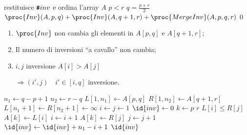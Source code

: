 \begin{codebox}
\zi \Comment restituisce $\verb|#| inv$ e ordina l'array $A$
\li \If $p < r$ 
\li \Then
		$q = \frac{p+r}{2}$
\li		\Return $\proc{Inv}(A,p,q) + \proc{Inv}(A,q+1,r) + \proc{MergeInv}(A,p,q,r)$
\li	\Else
\li		\Return $0$
	\End
\end{codebox}

\begin{enumerate}[label=($\alph*$)]
	\item $\proc{Inv}$ non cambia gli elementi in $A[p,q]$ e $A[q+1,r]$;
	\item Il numero di inversioni ``a cavallo'' non cambia;
	\item $i,j$ inversione $A[i] > A[j]$ \par
		$\Rightarrow (i',j) \quad i' \in [i,q]$ inversione. 
\end{enumerate}

\begin{codebox}
\li $n_1 \gets q - p + 1$
\li $n_2 \gets r - q$
\li $L[1,n_1] \gets A[p,q]$
\li $R[1,n_2] \gets A[q+1,r]$
\li $L[n_1+1] \gets R[n_2+1] \gets \infty$
\li $i \gets j \gets 1$
\li $\id{inv} \gets 0$
\li \For $k \gets p$ \To $r$
\li \Do
		\If $L[i] \leq R[j]$
\li		\Then
			$A[k] \gets L[i]$
\li 		$i \gets i + 1$
\li 	\Else
\li 		$A[k] \gets R[j]$
\li 		$j \gets j + 1$
\li 		$\id{inv} \gets \id{inv} + n_1 - i + 1$ 
		\End
	\End
\li \Return $\id{inv}$
\end{codebox}